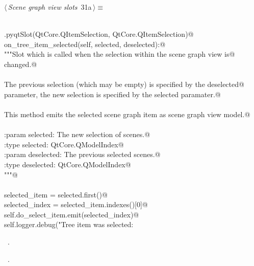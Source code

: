 \documentclass[
    a4paper,      %
    10pt,         %
    openright,    %
    notitlepage,  %
    parskip=half, %
]{scrreprt}       %
\theoremstyle{definition}                    %
\begin{document}
\begin{flushleft} \small
\begin{minipage}{\linewidth}\label{scrap34}\raggedright\small
{} $\langle\,${\itshape Scene graph view slots}\nobreak\ {\footnotesize {31a}}$\,\rangle\equiv$
\vspace{-1ex}
\begin{list}{}{} \item
\mbox{}\lstinline@@\\
\mbox{}\lstinline@QtCore.pyqtSlot(QtCore.QItemSelection, QtCore.QItemSelection)@\\
\mbox{}\lstinline@def on_tree_item_selected(self, selected, deselected):@\\
\mbox{}\lstinline@    """Slot which is called when the selection within the scene graph view is@\\
\mbox{}\lstinline@    changed.@\\
\mbox{}\lstinline@@\\
\mbox{}\lstinline@    The previous selection (which may be empty) is specified by the deselected@\\
\mbox{}\lstinline@    parameter, the new selection is specified by the selected paramater.@\\
\mbox{}\lstinline@@\\
\mbox{}\lstinline@    This method emits the selected scene graph item as scene graph view model.@\\
\mbox{}\lstinline@@\\
\mbox{}\lstinline@    :param selected: The new selection of scenes.@\\
\mbox{}\lstinline@    :type  selected: QtCore.QModelIndex@\\
\mbox{}\lstinline@    :param deselected: The previous selected scenes.@\\
\mbox{}\lstinline@    :type  deselected: QtCore.QModelIndex@\\
\mbox{}\lstinline@    """@\\
\mbox{}\lstinline@@\\
\mbox{}\lstinline@    selected_item = selected.first()@\\
\mbox{}\lstinline@    selected_index = selected_item.indexes()[0]@\\
\mbox{}\lstinline@    self.do_select_item.emit(selected_index)@\\
\mbox{}\lstinline@    self.logger.debug("Tree item was selected: %s" % selected_index)@{\NWsep}
\end{list}
\vspace{-1.5ex}
\footnotesize
\begin{list}{}{\setlength{\itemsep}{-\parsep}\setlength{\itemindent}{-\leftmargin}}
\item \NWtxtMacroDefBy\ .
\item \NWtxtMacroRefIn\ .

\item{}
\end{list}
\end{minipage}\vspace{4ex}
\end{flushleft}
\end{document}
